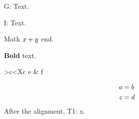 \documentclass{article}
\begin{document}
\begin{theindex}\end{theindex}
\newenvironment{theglossary}{}{}\makeatletter{}\makeatother
G: Text.

I: Text.

Math $x\index{inmath}+y$ end.

\textbf{Bold} text.

\begin{tabular}{>{\bfseries}c<{X}c}
e & f\\
\end{tabular}

\begin{align}
a\index{x&y} &= b \\
c &= d
\end{align}
After the alignment, T1: x.
\end{document}
